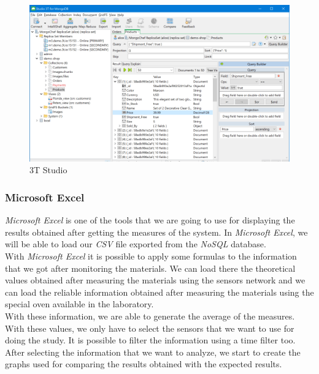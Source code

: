 \begin{figure}[H]
\begin{centering}
\includegraphics[scale=0.4]{IMGS/3T_STUDIO.png}
\caption{3T Studio \label{3T_STUDIO}}
\end{centering}
\end{figure}

\subsubsection{Microsoft Excel}

\textit{Microsoft Excel} is one of the tools that we are going to use for displaying the results obtained after getting the measures of the system. In \textit{Microsoft Excel}, we will be able to load our \textit{CSV} file exported from the \textit{NoSQL} database.\\

With \textit{Microsoft Excel} it is possible to apply some formulas to the information that we got after monitoring the materials. We can load there the theoretical values obtained after measuring the materials using the sensors network and we can load the reliable information obtained after measuring the materials using the special oven available in the laboratory.\\

With these information, we are able to generate the average of the measures. With these values, we only have to select the sensors that we want to use for doing the study. It is possible to filter the information using a time filter too.\\

After selecting the information that we want to analyze, we start to create the graphs used for comparing the results obtained with the expected results.\\

